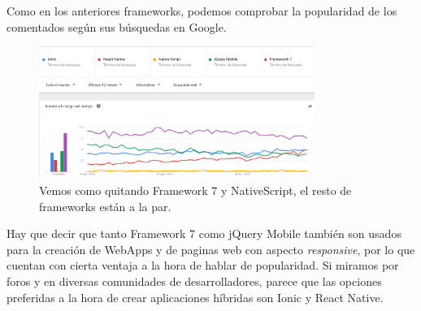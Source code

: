 
Como en los anteriores frameworks, podemos comprobar la popularidad de los comentados según sus búsquedas en Google.

\begin{figure}[H]
\centering
  \includegraphics[width=0.8\textwidth]{Figures/ch1/frameworks/graph_frameworks_hyb}
  \caption{Vemos como quitando Framework 7 y NativeScript, el resto de frameworks están a la par.}
\end{figure}

Hay que decir que tanto Framework 7 como jQuery Mobile también son usados para la creación de WebApps y de paginas web con aspecto \emph{responsive}, por lo que cuentan con cierta ventaja a la hora de hablar de popularidad. Si miramos por foros y en diversas comunidades de desarrolladores, parece que las opciones preferidas a la hora de crear aplicaciones híbridas son Ionic y React Native.
